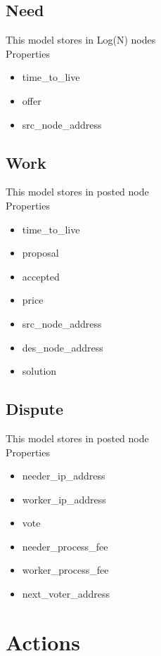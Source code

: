 \documentclass[12pt]{article}
\begin{document}
\subsection{Need}
This model stores in Log(N) nodes\\
Properties
\begin{itemize}
	\item time\_to\_live
	\item offer
	\item src\_node\_address
\end{itemize}

\subsection{Work}
This model stores in posted node\\
Properties
\begin{itemize}
	\item time\_to\_live
	\item proposal
	\item accepted
	\item price
	\item src\_node\_address
	\item des\_node\_address
	\item solution
\end{itemize}

\subsection{Dispute}
This model stores in posted node\\
Properties
\begin{itemize}
	\item needer\_ip\_address
	\item worker\_ip\_address
	\item vote
	\item needer\_process\_fee
	\item worker\_process\_fee
	\item next\_voter\_address
\end{itemize}

\section{Actions}
\end{document}
